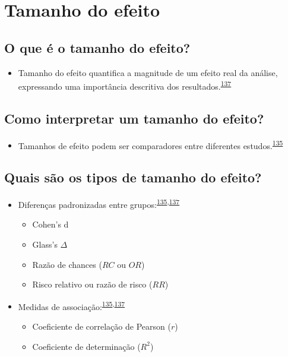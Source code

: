 \documentclass[
]{book}
\providecommand{\tightlist}{%
  \setlength{\itemsep}{0pt}\setlength{\parskip}{0pt}}
\begin{document}
\hypertarget{tamanho-efeito}{%
\section{Tamanho do efeito}\label{tamanho-efeito}}

\hypertarget{o-que-uxe9-o-tamanho-do-efeito}{%
\subsection{O que é o tamanho do efeito?}\label{o-que-uxe9-o-tamanho-do-efeito}}

\begin{itemize}
\tightlist
\item
  Tamanho do efeito quantifica a magnitude de um efeito real da análise, expressando uma importância descritiva dos resultados.\textsuperscript{\protect\hyperlink{ref-Kim2015}{137}}
\end{itemize}

\hypertarget{como-interpretar-um-tamanho-do-efeito}{%
\subsection{Como interpretar um tamanho do efeito?}\label{como-interpretar-um-tamanho-do-efeito}}

\begin{itemize}
\tightlist
\item
  Tamanhos de efeito podem ser comparadores entre diferentes estudos.\textsuperscript{\protect\hyperlink{ref-Sullivan2012}{135}}
\end{itemize}

\hypertarget{quais-suxe3o-os-tipos-de-tamanho-do-efeito}{%
\subsection{Quais são os tipos de tamanho do efeito?}\label{quais-suxe3o-os-tipos-de-tamanho-do-efeito}}

\begin{itemize}
\item
  Diferenças padronizadas entre grupos:\textsuperscript{\protect\hyperlink{ref-Sullivan2012}{135},\protect\hyperlink{ref-Kim2015}{137}}

  \begin{itemize}
  \item
    Cohen's d
  \item
    Glass's \(\Delta\)
  \item
    Razão de chances (\(RC\) ou \(OR\))
  \item
    Risco relativo ou razão de risco (\(RR\))
  \end{itemize}
\item
  Medidas de associação:\textsuperscript{\protect\hyperlink{ref-Sullivan2012}{135},\protect\hyperlink{ref-Kim2015}{137}}

  \begin{itemize}
  \item
    Coeficiente de correlação de Pearson (\(r\))
  \item
    Coeficiente de determinação (\(R^2\))
  \end{itemize}
\end{itemize}
\end{document}

